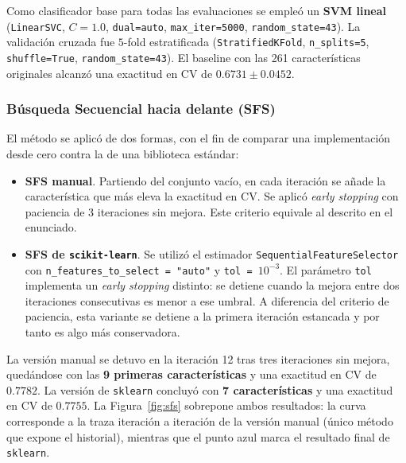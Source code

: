 Como clasificador base para todas las evaluaciones se empleó un \textbf{SVM
    lineal} (\texttt{LinearSVC}, $C=1.0$, \texttt{dual=\textquotesingle auto\textquotesingle},
\texttt{max\_iter=5000}, \texttt{random\_state=43}). La validación cruzada fue $5$-fold
estratificada (\texttt{StratifiedKFold}, \texttt{n\_splits=5}, \texttt{shuffle=True},
\texttt{random\_state=43}). El baseline con las 261 características originales alcanzó
una exactitud en CV de $0.6731 \pm 0.0452$.

\subsubsection*{Búsqueda Secuencial hacia delante (SFS)}

El método se aplicó de dos formas, con el fin de comparar una
implementación desde cero contra la de una biblioteca estándar:

\begin{itemize}
    \item \textbf{SFS manual}. Partiendo del conjunto vacío, en cada
          iteración se añade la característica que más eleva la exactitud
          en CV. Se aplicó \textit{early stopping} con paciencia de 3
          iteraciones sin mejora. Este criterio equivale al descrito en
          el enunciado.

    \item \textbf{SFS de \texttt{scikit-learn}}. Se utilizó el estimador
          \texttt{SequentialFeatureSelector} con
          \texttt{n\_features\_to\_select = "auto"} y
          \texttt{tol = $10^{-3}$}. El parámetro \texttt{tol} implementa
          un \textit{early stopping} distinto: se detiene cuando la
          mejora entre dos iteraciones consecutivas es menor a ese
          umbral. A diferencia del criterio de paciencia, esta variante
          se detiene a la primera iteración estancada y por tanto es
          algo más conservadora.
\end{itemize}

La versión manual se detuvo en la iteración 12 tras tres iteraciones sin
mejora, quedándose con las \textbf{9 primeras características} y una
exactitud en CV de $\mathbf{0.7782}$. La versión de \texttt{sklearn}
concluyó con \textbf{7 características} y una exactitud en CV de
$\mathbf{0.7755}$. La Figura~\ref{fig:sfs} sobrepone ambos resultados: la
curva corresponde a la traza iteración a iteración de la versión manual
(único método que expone el historial), mientras que el punto azul marca
el resultado final de \texttt{sklearn}.

